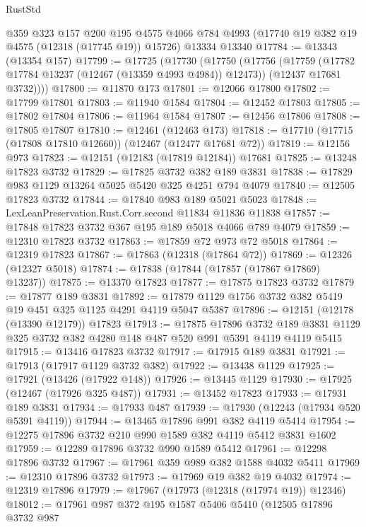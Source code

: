 \begin{lexlean}{RustStd}
\begin{coremodule}
    @359
    @323
    @157
    @200
    @195
    @4575
    @4066
    @784
    @4993
    (@17740 @19 @382 @19 @4575 (@12318 (@17745 @19)) @15726)
    @13334
    @13340
@17784 := @13343 (@13354 @157)
@17799 := @17725
    (@17730
      (@17750
        (@17756
          (@17759 (@17782 @17784 @13237 (@12467 (@13359 @4993 @4984)) @12473))
          (@12437 @17681 @3732))))
@17800 := @11870 @173
@17801 := @12066 @17800
@17802 := @17799 @17801
@17803 := @11940 @1584
@17804 := @12452 @17803
@17805 := @17802 @17804
@17806 := @11964 @1584
@17807 := @12456 @17806
@17808 := @17805 @17807
@17810 := @12461 (@12463 @173)
@17818 := @17710 (@17715 (@17808 @17810 @12660)) (@12467 (@12477 @17681 @72))
@17819 := @12156 @973
@17823 := @12151 (@12183 (@17819 @12184)) @17681
@17825 := @13248 @17823 @3732
@17829 := @17825 @3732 @382 @189 @3831
@17838 := @17829 @983 @1129 @13264 @5025 @5420 @325 @4251 @794 @4079
@17840 := @12505 @17823 @3732
@17844 := @17840 @983 @189 @5021 @5023
@17848 := LexLeanPreservation.Rust.Corr.second @11834 @11836 @11838
@17857 := @17848 @17823 @3732 @367 @195 @189 @5018 @4066 @789 @4079
@17859 := @12310 @17823 @3732
@17863 := @17859 @72 @973 @72 @5018
@17864 := @12319 @17823
@17867 := @17863 (@12318 (@17864 @72))
@17869 := @12326 (@12327 @5018)
@17874 := @17838 (@17844 (@17857 (@17867 @17869) @13237))
@17875 := @13370 @17823
@17877 := @17875 @17823 @3732
@17879 := @17877 @189 @3831
@17892 := @17879 @1129 @1756 @3732 @382 @5419 @19 @451 @325 @1125 @4291 @4119 @5047 @5387
@17896 := @12151 (@12178 (@13390 @12179)) @17823
@17913 := @17875
    @17896
    @3732
    @189
    @3831
    @1129
    @325
    @3732
    @382
    @4280
    @148
    @487
    @520
    @991
    @5391
    @4119
    @4119
    @5415
@17915 := @13416 @17823 @3732
@17917 := @17915 @189 @3831
@17921 := @17913 (@17917 @1129 @3732 @382)
@17922 := @13438 @1129
@17925 := @17921 (@13426 (@17922 @148))
@17926 := @13445 @1129
@17930 := @17925 (@12467 (@17926 @325 @487))
@17931 := @13452 @17823
@17933 := @17931 @189 @3831
@17934 := @17933 @487
@17939 := @17930 (@12243 (@17934 @520 @5391 @4119))
@17944 := @13465 @17896 @991 @382 @4119 @5414
@17954 := @12275 @17896 @3732 @210 @990 @1589 @382 @4119 @5412 @3831 @1602
@17959 := @12289 @17896 @3732 @990 @1589 @5412
@17961 := @12298 @17896 @3732
@17967 := @17961 @359 @989 @382 @1588 @4032 @5411
@17969 := @12310 @17896 @3732
@17973 := @17969 @19 @382 @19 @4032
@17974 := @12319 @17896
@17979 := @17967 (@17973 (@12318 (@17974 @19)) @12346)
@18012 := @17961
    @987
    @372
    @195
    @1587
    @5406
    @5410
    (@12505
      @17896
      @3732
      @987

\end{coremodule}
\end{lexlean}

